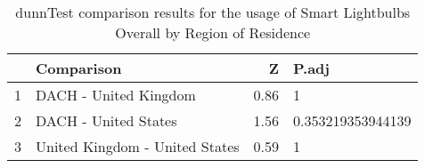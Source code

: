 \begin{table}[ht]
\centering
\begin{tabular}{rlrl}
  \hline
 & Comparison & Z & P.adj \\ 
  \hline
1 & DACH - United Kingdom & 0.86 & 1   \\ 
  2 & DACH - United States & 1.56 & 0.353219353944139   \\ 
  3 & United Kingdom - United States & 0.59 & 1   \\ 
   \hline
\end{tabular}
\caption{dunnTest comparison results for the usage of Smart Lightbulbs Overall by Region of Residence} 
\label{RQ2_H2_UsageRegionSmartLightbulbs}
\end{table}
